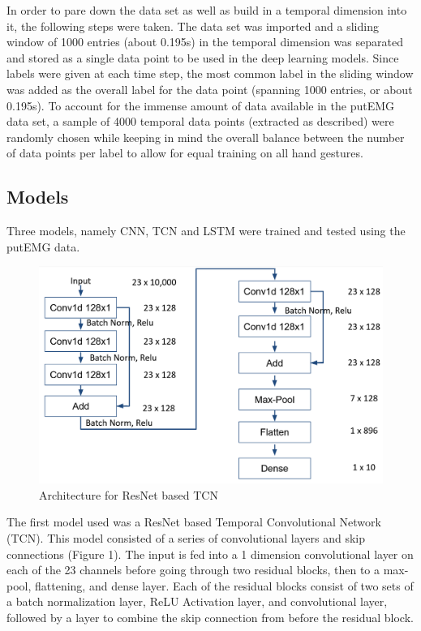 \documentclass[conference]{IEEEtran}
\begin{document}
In order to pare down the data set as well as build in a temporal dimension into it, the following steps were taken. The data set was imported and a sliding window of 1000 entries (about 0.195s) in the temporal dimension was separated and stored as a single data point to be used in the deep learning models. Since labels were given at each time step, the most common label in the sliding window was added as the overall label for the data point (spanning 1000 entries, or about 0.195s). To account for the immense amount of data available in the putEMG data set, a sample of 4000 temporal data points (extracted as described) were randomly chosen while keeping in mind the overall balance between the number of data points per label to allow for equal training on all hand gestures.

\subsection{Models}
Three models, namely CNN, TCN and LSTM were trained and tested using the putEMG data.
\begin{figure}
    \centering
    \includegraphics[scale = 0.55]{TCN.png}
    \caption{ Architecture for ResNet based TCN}
\end{figure}
The first model used was a ResNet based Temporal Convolutional Network (TCN). This model consisted of a series of convolutional layers and skip connections (Figure 1). The input is fed into a 1 dimension convolutional layer on each of the 23 channels before going through two residual blocks, then to a max-pool, flattening, and dense layer. Each of the residual blocks consist of two sets of a batch normalization layer, ReLU Activation layer, and convolutional layer, followed by a layer to combine the skip connection from before the residual block.\newline 
\end{document}
